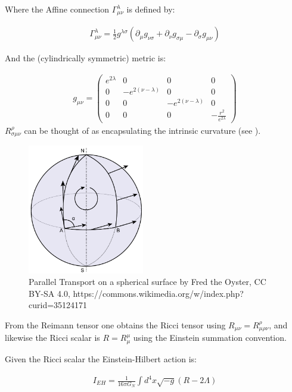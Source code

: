 \documentclass[12pt]{article}
\begin{document}
Where the Affine connection $\Gamma_{\mu\nu}^{\lambda}$ is defined by:

\begin{align}
  \Gamma_{\mu\nu}^{\lambda}=\frac{1}{2}g^{\lambda\sigma}\left(\partial_{\mu}g_{\nu\sigma}+\partial_{\nu}g_{\sigma\mu}-\partial_{\sigma}g_{\mu\nu}\right)
\end{align}

And the (cylindrically symmetric) metric is:

\begin{align}
  g_{\mu\nu}=\left(\begin{array}{cccc}
    e^{2\lambda} & 0 & 0 & 0\\
    0 & -e^{2\left(\nu-\lambda\right)} & 0 & 0\\
    0 & 0 & -e^{2\left(\nu-\lambda\right)} & 0\\
    0 & 0 & 0 & -\frac{r^{2}}{e^{2\lambda}}
    \end{array}\right)
\end{align}
$R^{\rho}_{\sigma\mu\nu}$ can be thought of as encapsulating the intrinsic curvature (see ).
\begin{figure}
  \centering
  \includegraphics[width=2in]{Parallel_Transport.pdf}
  \caption{Parallel Transport on a spherical surface by Fred the Oyster, CC BY-SA 4.0, https://commons.wikimedia.org/w/index.php?curid=35124171 \label{parallel-transport-figure}}
\end{figure}

From the Reimann tensor one obtains the Ricci tensor using $R_{\mu\nu}=R^{\rho}_{\mu\rho\nu}$, and likewise the Ricci scalar is $R=R^{\mu}_{\mu}$ using the Einstein summation convention.

Given the Ricci scalar the Einstein-Hilbert action is:

\begin{align}
I_{EH}=\frac{1}{16\pi G_{N}}\int d^{4}x\sqrt{-g}(R-2\Lambda)
\end{align}
\end{document}
